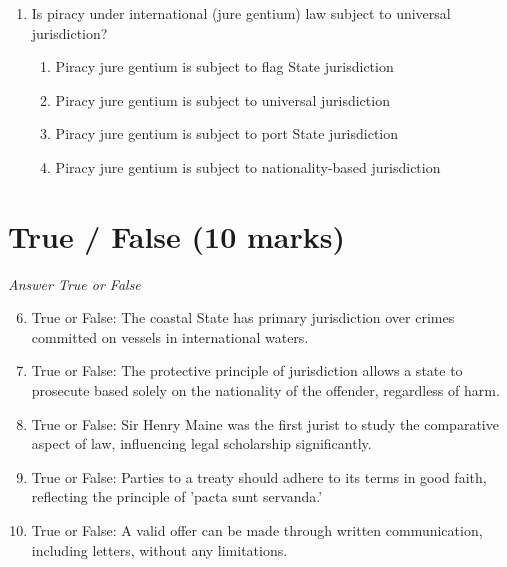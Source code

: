 \documentclass[12pt]{article}
\begin{document}
\begin{enumerate}[label=\arabic*.]
\begin{enumerate}[label=(\alph*)]
    \item Standard-setting means putting forward binding legal standards
    \item Standard-setting means merely proposing binding legal standards
    \item Standard-setting means putting forward non-binding legal standards
    \item Standard-setting means setting certain standards of conduct in human rights treaties
\end{enumerate}
\item Is piracy under international (jure gentium) law subject to universal jurisdiction?
\begin{enumerate}[label=(\alph*)]
    \item Piracy jure gentium is subject to flag State jurisdiction
    \item Piracy jure gentium is subject to universal jurisdiction
    \item Piracy jure gentium is subject to port State jurisdiction
    \item Piracy jure gentium is subject to nationality-based jurisdiction
\end{enumerate}
\end{enumerate}

\section*{True / False (10 marks)}
\textit{Answer True or False}
\begin{enumerate}[label=\arabic*.]
\setcounter{enumi}{5}
\item True or False: The coastal State has primary jurisdiction over crimes committed on vessels in international waters.
\item True or False: The protective principle of jurisdiction allows a state to prosecute based solely on the nationality of the offender, regardless of harm.
\item True or False: Sir Henry Maine was the first jurist to study the comparative aspect of law, influencing legal scholarship significantly.
\item True or False: Parties to a treaty should adhere to its terms in good faith, reflecting the principle of 'pacta sunt servanda.'
\item True or False: A valid offer can be made through written communication, including letters, without any limitations.
\end{enumerate}
\end{document}
